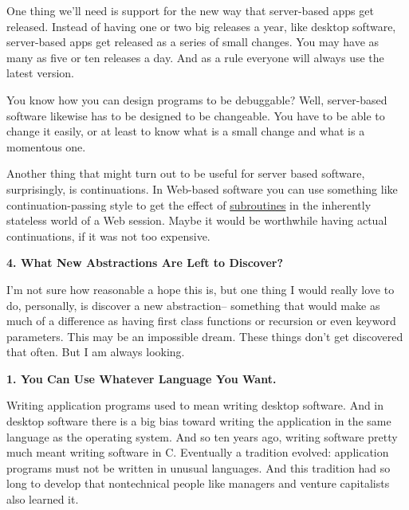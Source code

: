 One
                    thing we'll need is support for the new way that
                    server-based apps get released. Instead of having one or two
                    big releases a year, like desktop software, server-based
                    apps get released as a series of small changes. You may have
                    as many as five or ten releases a day. And as a rule
                    everyone will always use the latest version.

You
                    know how you can design programs to be debuggable? Well,
                    server-based software likewise has to be designed to be
                    changeable. You have to be able to change it easily, or at
                    least to know what is a small change and what is a momentous
                    one.

Another thing that might turn out to be
                    useful for server based software, surprisingly, is
                    continuations. In Web-based software you can use something
                    like continuation-passing style to get the effect of
                    \href{http://www.paulgraham.com/lwba.html}{subroutines} in the inherently
                    stateless world of a Web session. Maybe it would be
                    worthwhile having actual continuations, if it was not too
                    expensive.

\textbf{4. What New Abstractions Are Left to Discover?}

I'm not sure how reasonable a hope this is, but
                    one thing I would really love to do, personally, is discover
                    a new abstraction-- something that would make as much of a
                    difference as having first class functions or recursion or
                    even keyword parameters. This may be an impossible dream.
                    These things don't get discovered that often. But I am
                    always looking.





\textbf{1. You Can Use Whatever Language You Want.}

Writing application programs used to mean
                    writing desktop software. And in desktop software there is a
                    big bias toward writing the application in the same language
                    as the operating system. And so ten years ago, writing
                    software pretty much meant writing software in C. Eventually
                    a tradition evolved: application programs must not be
                    written in unusual languages. And this tradition had so long
                    to develop that nontechnical people like managers and
                    venture capitalists also learned it.

